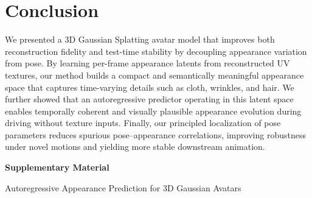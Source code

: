 \documentclass[runningheads]{llncs}
\begin{document}
\section{Conclusion}

We presented a 3D Gaussian Splatting avatar model that improves both reconstruction fidelity and test-time stability by decoupling appearance variation from pose.
By learning per-frame appearance latents from reconstructed UV textures, our method builds a compact and semantically meaningful appearance space that captures time-varying details such as cloth, wrinkles, and hair.
We further showed that an autoregressive predictor operating in this latent space enables temporally coherent and visually plausible appearance evolution during driving without texture inputs.
Finally, our principled localization of pose parameters reduces spurious pose--appearance correlations, improving robustness under novel motions and yielding more stable downstream animation.




\clearpage

%
%



\clearpage

\appendix

\begin{center}
  {\LARGE\bfseries Supplementary Material\par}
  \vspace{0.5em}
  {\large {Autoregressive Appearance Prediction for 3D Gaussian Avatars}}
\end{center}
\end{document}

